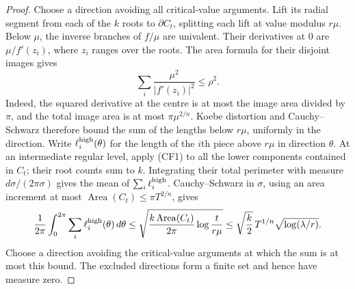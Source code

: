 \begin{proof}
Choose a direction avoiding all critical-value arguments. Lift its radial
segment from each of the $k$ roots to $\partial C_t$, splitting each lift
at value modulus $r\mu$. Below $\mu$, the inverse branches of $f/\mu$
are univalent. Their derivatives at $0$ are $\mu/f'(z_i)$, where $z_i$
ranges over the roots. The area formula for their disjoint images gives
\[
 \sum_i\frac{\mu^2}{|f'(z_i)|^2}\le\rho^2.        \tag{CF2}
\]
Indeed, the squared derivative at the centre is at most the image area
divided by $\pi$, and the total image area is at most $\pi\mu^{2/n}$.
Koebe distortion and Cauchy--Schwarz therefore bound the sum of the
lengths below $r\mu$, uniformly in the direction. Write
$\ell_i^{\rm high}(\theta)$ for the length of the $i$th piece above
$r\mu$ in direction $\theta$. At an intermediate regular level, apply
(CF1) to all the lower components contained in $C_t$; their root counts
sum to $k$. Integrating their total perimeter with measure
$d\sigma/(2\pi\sigma)$ gives the mean of $\sum_i\ell_i^{\rm high}$.
Cauchy--Schwarz in $\sigma$, using an area increment at most
$\operatorname{Area}(C_t)\le\pi T^{2/n}$, gives
\[
 \frac1{2\pi}\int_0^{2\pi}\sum_i\ell_i^{\rm high}(\theta)\,d\theta
 \le\sqrt{\frac{k\operatorname{Area}(C_t)}{2\pi}
                   \log\frac{t}{r\mu}}
 \le\sqrt{\frac k2}\,T^{1/n}\sqrt{\log(\lambda/r)}.
\]
Choose a direction avoiding the critical-value arguments at which the
sum is at most this bound. The excluded directions form a finite set
and hence have measure zero.


\end{proof}

